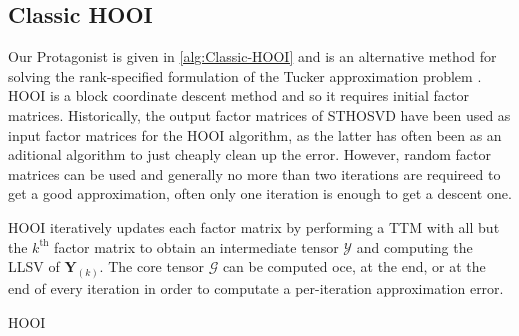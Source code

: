 \subsection{Classic HOOI}
    Our Protagonist is given in \cref{alg:Classic-HOOI} and is an alternative
    method for solving the rank-specified formulation of the Tucker
    approximation problem
    \cite{kroonenberg1980principal,de2000best,kapteyn1986approach}. HOOI is a
    block coordinate descent method and so it requires initial factor matrices.
    Historically, the output factor matrices of STHOSVD have been used as input
    factor matrices for the HOOI algorithm, as the latter has often been as an
    aditional algorithm to just cheaply clean up the error. However, random
    factor matrices can be used and generally no more than two iterations are
    requireed to get a good approximation, often only one iteration is enough to
    get a descent one. 

    HOOI iteratively updates each factor matrix by performing a TTM with all but
    the $k^\text{th}$ factor matrix to obtain an intermediate tensor
    $\mathcal{Y}$ and computing the LLSV of $\mathbf{Y}_{(k)}$. The core tensor
    $\mathcal G$ can be computed oce, at the end, or at the end of every
    iteration in order to computate a per-iteration approximation error. 

    \begin{algorithm}
        \caption{HOOI}
        \label{alg:Classic-HOOI}
        \begin{algorithmic}
            
                    \EndFor{}
                \EndFor{}
                 
                 
            \EndFunction
        \end{algorithmic}
    \end{algorithm}

